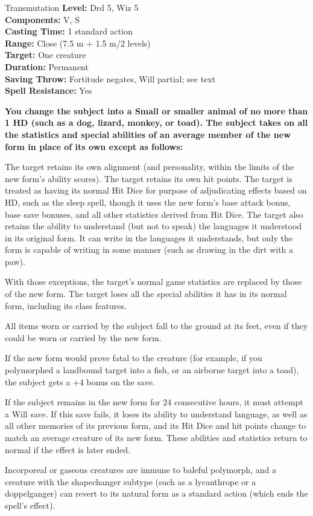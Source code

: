 {Transmutation}
{
	\textbf{Level:}
	Drd 5, Wiz 5\\
	\textbf{Components:}
	V, S\\
	\textbf{Casting Time:}
	1 standard action\\
	\textbf{Range:}
	Close (7.5 m + 1.5 m/2 levels)\\
	\textbf{Target:}
	One creature\\
	\textbf{Duration:}
	Permanent\\
	\textbf{Saving Throw:}
	Fortitude negates, Will partial; see text\\
	\textbf{Spell Resistance:}
	Yes\\
}
{
	\textbf{	You change the subject into a Small or smaller animal of no more than 1 HD (such as a dog, lizard, monkey, or toad). The subject takes on all the statistics and special abilities of an average member of the new form in place of its own except as follows:}


The target retains its own alignment (and personality, within the limits of the new form's ability scores).
The target retains its own hit points.
The target is treated as having its normal Hit Dice for purpose of adjudicating effects based on HD, such as the sleep spell, though it uses the new form's base attack bonus, base save bonuses, and all other statistics derived from Hit Dice.
The target also retains the ability to understand (but not to speak) the languages it understood in its original form. It can write in the languages it understands, but only the form is capable of writing in some manner (such as drawing in the dirt with a paw).

	With those exceptions, the target's normal game statistics are replaced by those of the new form. The target loses all the special abilities it has in its normal form, including its class features.

	All items worn or carried by the subject fall to the ground at its feet, even if they could be worn or carried by the new form.

	If the new form would prove fatal to the creature (for example, if you polymorphed a landbound target into a fish, or an airborne target into a toad), the subject gets a +4 bonus on the save.

	If the subject remains in the new form for 24 consecutive hours, it must attempt a Will save. If this save fails, it loses its ability to understand language, as well as all other memories of its previous form, and its Hit Dice and hit points change to match an average creature of its new form. These abilities and statistics return to normal if the effect is later ended.

Incorporeal or gaseous creatures are immune to baleful polymorph, and a creature with the shapechanger subtype (such as a lycanthrope or a doppelganger) can revert to its natural form as a standard action (which ends the spell's effect).

}
